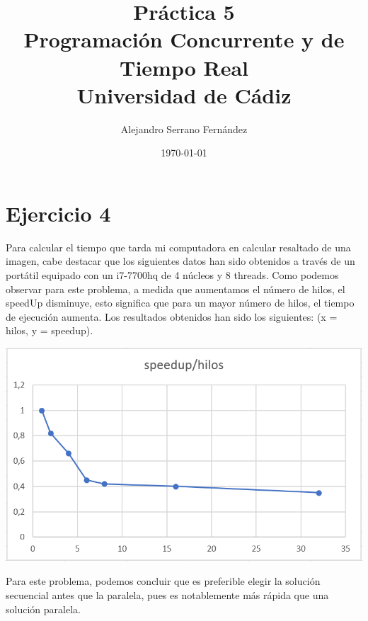 \documentclass{article}
\title{Práctica 5 \\ Programación Concurrente y de Tiempo Real \\Universidad de Cádiz} %
\author{Alejandro Serrano Fernández} %
\date{\today} %
\begin{document}
\maketitle %


\section{Ejercicio 4}
Para calcular el tiempo que tarda mi computadora en calcular resaltado de una imagen, cabe destacar que los siguientes datos han sido obtenidos a través de un portátil equipado con un i7-7700hq de 4 núcleos y 8 threads. Como podemos observar para este problema, a medida que aumentamos el número de hilos, el speedUp disminuye, esto significa que para un mayor número de hilos, el tiempo de ejecución aumenta. Los resultados obtenidos han sido los siguientes: (x = hilos, y = speedup).

\hfill \break
\begin{center}
\includegraphics[scale=0.5]{grafico-ejercicio4.png}
\end{center}
Para este problema, podemos concluir que es preferible elegir la solución secuencial antes que la paralela, pues es notablemente más rápida que una solución paralela.
\end{document}
